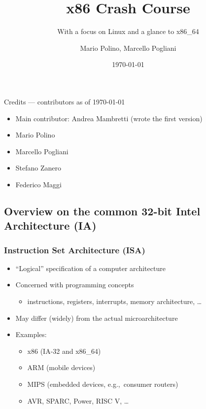 \documentclass[]{beamer}
\title{x86 Crash Course}
\subtitle{With a focus on Linux and a glance to x86\_64}
\author[NECSTLab]{Mario Polino, Marcello Pogliani}
\institute{DEIB, Politecnico di Milano}
\date{\today}
\begin{document}
\begin{frame}
	\titlepage
\end{frame}

\begin{frame}{Credits --- contributors as of \today}
	\begin{itemize}
  		\item Main contributor: Andrea Mambretti (wrote the first version)
  		\item Mario Polino
		\item Marcello Pogliani
  		\item Stefano Zanero
  		\item Federico Maggi
  	\end{itemize}
\end{frame}


\subsection{Overview on the common 32-bit Intel Architecture (IA)}

\begin{frame}
	\frametitle{Instruction Set Architecture (ISA)}
	\begin{itemize}
	\item ``Logical'' specification of a computer architecture
	\item Concerned with programming concepts
	\begin{itemize}
		\item instructions, registers, interrupts, memory architecture, \dots
	\end{itemize}
	\item May differ (widely) from the actual microarchitecture
	\item Examples:
		\begin{itemize}
			\item x86 (IA-32 and x86\_64)
			\item ARM (mobile devices)
			\item MIPS (embedded devices, e.g.,~consumer routers)
			\item AVR, SPARC, Power, RISC V, \dots
		\end{itemize}
	\end{itemize}
\end{frame}
\end{document}
